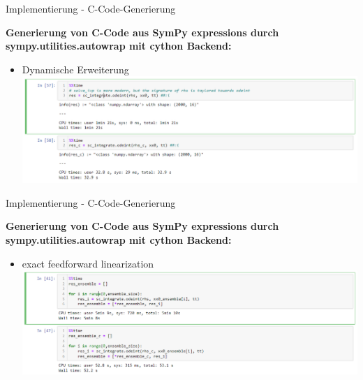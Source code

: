\documentclass[
	ngerman,
	10pt,				%
	aspectratio=169, 	%
	xcolor=dvipsnames
]{beamer}
\begin{document}
\begin{frame}[t,fragile,label=CCodeGen]{\large Implementierung - C-Code-Generierung}
	
	\textbf{Generierung von C-Code aus SymPy expressions durch sympy.utilities.autowrap mit cython Backend:}
	\begin{itemize}
		\item Dynamische Erweiterung
		\includegraphics[width=140mm]{images/C_Codegen/dyn_extension_comparison}
	\end{itemize}
	
\end{frame}


\begin{frame}[t,fragile,label=CCodeGen]{\large Implementierung - C-Code-Generierung}
	
	\textbf{Generierung von C-Code aus SymPy expressions durch sympy.utilities.autowrap mit cython Backend:}
	\begin{itemize}
		\item exact feedforward linearization
		\includegraphics[width=140mm]{images/C_Codegen/exact_ff_lin_comparison}
	\end{itemize}

\end{frame}

\end{document}
